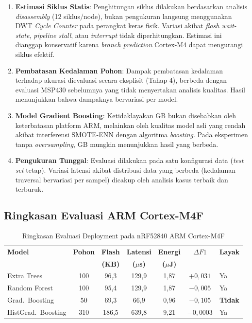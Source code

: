 \begin{enumerate}
    \item \textbf{Estimasi Siklus Statis}: Penghitungan siklus dilakukan berdasarkan analisis \textit{disassembly} (12 siklus/node), bukan pengukuran langsung menggunakan DWT \textit{Cycle Counter} pada perangkat keras fisik. Variasi akibat \textit{flash wait-state}, \textit{pipeline stall}, atau \textit{interrupt} tidak diperhitungkan. Estimasi ini dianggap konservatif karena \textit{branch prediction} Cortex-M4 dapat mengurangi siklus efektif.

    \item \textbf{Pembatasan Kedalaman Pohon}: Dampak pembatasan kedalaman terhadap akurasi dievaluasi secara eksplisit (Tahap 4), berbeda dengan evaluasi MSP430 sebelumnya yang tidak menyertakan analisis kualitas. Hasil menunjukkan bahwa dampaknya bervariasi per model.

    \item \textbf{Model Gradient Boosting}: Ketidaklayakan GB bukan disebabkan oleh keterbatasan platform ARM, melainkan oleh kualitas model asli yang rendah akibat interferensi SMOTE-ENN dengan algoritma \textit{boosting}. Pada eksperimen tanpa \textit{oversampling}, GB mungkin menunjukkan hasil yang berbeda.

    \item \textbf{Pengukuran Tunggal}: Evaluasi dilakukan pada satu konfigurasi data (\textit{test set} tetap). Variasi latensi akibat distribusi data yang berbeda (kedalaman traversal bervariasi per sampel) dicakup oleh analisis kasus terbaik dan terburuk.
\end{enumerate}

\subsection{Ringkasan Evaluasi ARM Cortex-M4F}

\begin{table}[htbp]
\centering
\caption{Ringkasan Evaluasi Deployment pada nRF52840 ARM Cortex-M4F}
\label{tab:arm_summary}
\begin{tabular}{lcccccl}
\hline
\textbf{Model} & \textbf{Pohon} & \textbf{Flash} & \textbf{Latensi} & \textbf{Energi} & \textbf{$\Delta F1$} & \textbf{Layak} \\
 & & \textbf{(KB)} & \textbf{($\mu$s)} & \textbf{($\mu$J)} & & \\
\hline
Extra Trees & 100 & 96,3 & 129,9 & 1,87 & $+0{,}031$ & Ya \\
Random Forest & 100 & 95,4 & 129,9 & 1,87 & $-0{,}005$ & Ya \\
Grad.\ Boosting & 50 & 69,3 & 66,9 & 0,96 & $-0{,}105$ & \textbf{Tidak} \\
HistGrad.\ Boosting & 310 & 186,5 & 639,8 & 9,21 & $-0{,}0003$ & Ya \\
\hline
\end{tabular}
\end{table}

